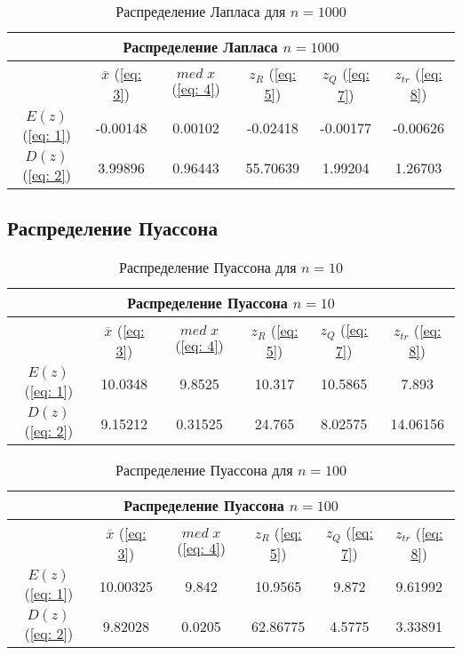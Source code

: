 \documentclass{article}
\begin{document}
\begin{table}[hb]
\begin{center}
\begin{tabular}{|c|c|c|c|c|c|}
\hline 
\multicolumn{6}{|c|}{Распределение Лапласа $n=1000$} \\ 
\hline 
  & $\overline{x}$ (\ref{eq: 3}) & $med \; x$ (\ref{eq: 4}) & $z_R$ (\ref{eq: 5}) & $z_Q$ (\ref{eq: 7}) & $z_{tr}$ (\ref{eq: 8}) \\ 
\hline 
$E(z)$ (\ref{eq: 1}) & -0.00148 & 0.00102 & -0.02418 & -0.00177 & -0.00626 \\ 
\hline 
$D(z)$ (\ref{eq: 2}) & 3.99896 & 0.96443 & 55.70639 & 1.99204 & 1.26703 \\ 
\hline 
\end{tabular} 
\caption{Распределение Лапласа для $n=1000$}
\end{center}
\end{table}

\newpage
\subsection{Распределение Пуассона}

\begin{table}[hb]
\begin{center}
\begin{tabular}{|c|c|c|c|c|c|}
\hline 
\multicolumn{6}{|c|}{Распределение Пуассона $n=10$} \\ 
\hline 
  & $\overline{x}$ (\ref{eq: 3}) & $med \; x$ (\ref{eq: 4}) & $z_R$ (\ref{eq: 5}) & $z_Q$ (\ref{eq: 7}) & $z_{tr}$ (\ref{eq: 8}) \\ 
\hline 
$E(z)$ (\ref{eq: 1}) & 10.0348 & 9.8525 & 10.317 & 10.5865 & 7.893 \\ 
\hline 
$D(z)$ (\ref{eq: 2}) & 9.15212 & 0.31525 & 24.765 & 8.02575 & 14.06156 \\ 
\hline 
\end{tabular} 
\caption{Распределение Пуассона для $n=10$}
\end{center}
\end{table}

\begin{table}[hb]
\begin{center}
\begin{tabular}{|c|c|c|c|c|c|}
\hline 
\multicolumn{6}{|c|}{Распределение Пуассона $n=100$} \\ 
\hline 
  & $\overline{x}$ (\ref{eq: 3}) & $med \; x$ (\ref{eq: 4}) & $z_R$ (\ref{eq: 5}) & $z_Q$ (\ref{eq: 7}) & $z_{tr}$ (\ref{eq: 8}) \\ 
\hline 
$E(z)$ (\ref{eq: 1}) & 10.00325 & 9.842 & 10.9565 & 9.872 & 9.61992 \\ 
\hline 
$D(z)$ (\ref{eq: 2}) & 9.82028 & 0.0205 & 62.86775 & 4.5775 & 3.33891 \\ 
\hline 
\end{tabular} 
\caption{Распределение Пуассона для $n=100$}
\end{center}
\end{table}
\end{document}
